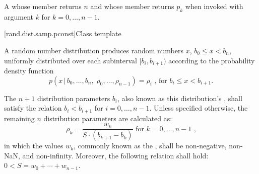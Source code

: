 \begin{itemdescr}
\pnum
\returns
A 
 whose  member returns $n$
 and whose  member returns $p_k$
 when invoked with argument $k$ for $k = 0, \dotsc, n - 1$.
\end{itemdescr}



[rand.dist.samp.pconst]{Class template }%
%

\pnum
A  random number distribution
produces random numbers $x$,
$b_0 \leq x < b_n$,
uniformly distributed over each subinterval
$[ b_i, b_{i+1} )$
according to the probability density function
\[ p(x \,|\, b_0, \dotsc, b_n, \; \rho_0, \dotsc, \rho_{n-1}) = \rho_i
   \text{ , for $b_i \le x < b_{i+1}$.} \]

\pnum
The $n + 1$ distribution parameters $b_i$,
also known as this distribution's %
, shall satisfy the relation
$b_i < b_{i + 1}$ for $i = 0, \dotsc, n - 1$.
Unless specified otherwise,
the remaining $n$ distribution parameters are calculated as:
\[ \rho_k = \frac{w_k}{S \cdot (b_{k+1}-b_k)} \text{ for } k = 0, \dotsc, n - 1 \text{ ,} \]
in which the values $w_k$,
commonly known as the %
, shall be non-negative, non-NaN, and non-infinity.
Moreover, the following relation shall hold:
 $0 < S = w_0 + \dotsb + w_{n-1}$.

